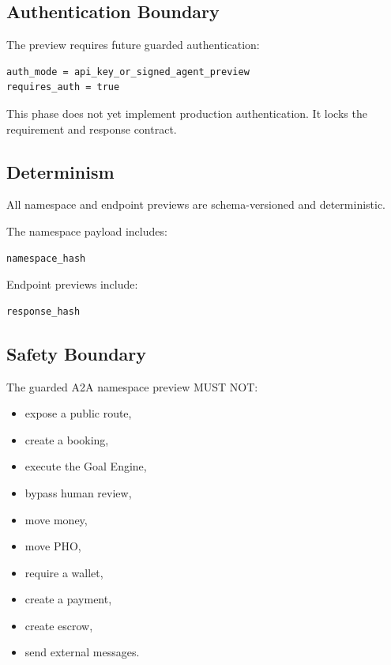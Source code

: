 \subsection{Authentication Boundary}

The preview requires future guarded authentication:

\begin{verbatim}
auth_mode = api_key_or_signed_agent_preview
requires_auth = true
\end{verbatim}

This phase does not yet implement production authentication. It locks the requirement and response contract.

\subsection{Determinism}

All namespace and endpoint previews are schema-versioned and deterministic.

The namespace payload includes:

\begin{verbatim}
namespace_hash
\end{verbatim}

Endpoint previews include:

\begin{verbatim}
response_hash
\end{verbatim}

\subsection{Safety Boundary}

The guarded A2A namespace preview MUST NOT:

\begin{itemize}
  \item expose a public route,
  \item create a booking,
  \item execute the Goal Engine,
  \item bypass human review,
  \item move money,
  \item move PHO,
  \item require a wallet,
  \item create a payment,
  \item create escrow,
  \item send external messages.
\end{itemize}

